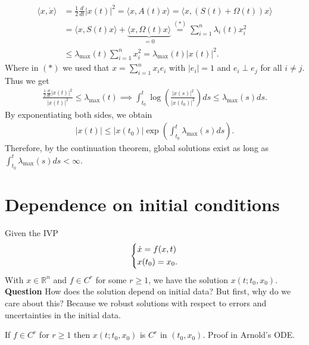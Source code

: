 \begin{ex}
\begin{align}
	\langle x, \dot{x} \rangle &= \frac{1}{2} \frac{d}{dt} |x(t)|^2 = \langle x, A(t) x\rangle = \langle x, (S(t) + \Omega(t) ) x \rangle \\
				   &= \langle x, S(t) x \rangle + \underbrace{\langle x, \Omega(t) x \rangle}_{=0} \stackrel{(*)}{=} 
				   \sum_{i=1}^{n} \lambda_i(t) x_i^2 \\
				   &\leq \lambda_{ \textrm{max} }(t) \sum_{i=1}^{n} x_i^2 = \lambda _{ \textrm{max} }(t) | x(t)|^2.
\end{align}
Where in $(*)$ we used that $x = \sum_{i=1}^{n} x_i e_i $ with $|e_i|=1$ and $e_i \perp e_j$ for all $i \neq j$. Thus we get
\begin{align}
	\frac{\frac{1}{2}\frac{d}{dt}|x(t)|^2}{|x(t)|^2} \leq \lambda_{ \textrm{max} }(t) 
	\implies \int_{t_0}^{t} \log \left( \frac{|x(s)|^2}{|x(t_0)|^2} \right) ds \leq \lambda _{ \textrm{max} }(s) ds.
\end{align}
By exponentiating both sides, we obtain
\begin{align}
\boxed{ |x(t)| \leq |x(t_0) | \exp\left(\int_{t_0}^{t} \lambda_{ \textrm{max} }(s)ds\right).}
\end{align}
Therefore, by the continuation theorem, global solutions exist as long as $\int_{t_0}^{t} \lambda_{ \textrm{max} }(s) ds < \infty $.
\end{ex}

\section{Dependence on initial conditions}
Given the IVP
\begin{align}
	\begin{dcases}
	\dot{x} = f(x,t) \\ x(t_0) = x_0.
	\end{dcases}
\end{align}
With $x \in \mathbb{R}^{n}$ and $f\in C^r$ for some $r\geq 1$, we have the solution $x(t; t_0, x_0)$.
\textbf{Question} How does the solution depend on initial data?
But first, why do we care about this? Because we robust solutions with respect to errors and uncertainties in the initial data.
\begin{theorem}[]
	If $f \in C^r$ for $r\geq 1$ then $x(t; t_0, x_0)$ is $C^r$ in $(t_0, x_0)$. Proof in Arnold's ODE.
\end{theorem}

